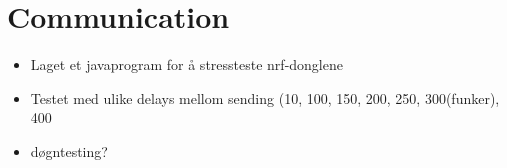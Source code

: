 \section{Communication}
\begin{itemize}
    \item Laget et javaprogram for å stressteste nrf-donglene
    \item Testet med ulike delays mellom sending (10, 100, 150, 200, 250, 300(funker), 400
    \item døgntesting?
\end{itemize}



